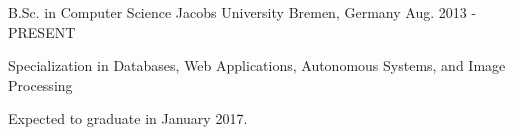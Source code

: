 

\begin{cventries}

  \cventry
    {B.Sc. in Computer Science} %
    {Jacobs University} %
    {Bremen, Germany} %
    {Aug. 2013 - PRESENT} %
    {
      \begin{cvitems} %
        \item {Specialization in Databases, Web Applications, Autonomous Systems, and Image Processing}
        \item {Expected to graduate in January 2017.}
      \end{cvitems}
    }

\end{cventries}
